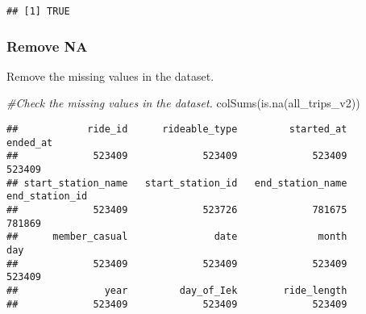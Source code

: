 \documentclass[
]{article}
\newenvironment{Shaded}{\begin{snugshade}}{\end{snugshade}}
\newcommand{\CommentTok}[1]{\textcolor[rgb]{0.56,0.35,0.01}{\textit{#1}}}
\newcommand{\DecValTok}[1]{\textcolor[rgb]{0.00,0.00,0.81}{#1}}
\newcommand{\FunctionTok}[1]{\textcolor[rgb]{0.00,0.00,0.00}{#1}}
\newcommand{\NormalTok}[1]{#1}
\newcommand{\OtherTok}[1]{\textcolor[rgb]{0.56,0.35,0.01}{#1}}
\newcommand{\SpecialCharTok}[1]{\textcolor[rgb]{0.00,0.00,0.00}{#1}}
\newcommand{\StringTok}[1]{\textcolor[rgb]{0.31,0.60,0.02}{#1}}
\begin{document}
\begin{verbatim}
## [1] TRUE
\end{verbatim}

\begin{Shaded}
\end{Shaded}

\hypertarget{remove-na}{%
\subsubsection{Remove NA}\label{remove-na}}

Remove the missing values in the dataset.

\begin{Shaded}
\begin{Highlighting}[]
\CommentTok{\#Check the missing values in the dataset.}
\FunctionTok{colSums}\NormalTok{(}\FunctionTok{is.na}\NormalTok{(all\_trips\_v2))}
\end{Highlighting}
\end{Shaded}

\begin{verbatim}
##            ride_id      rideable_type         started_at           ended_at 
##             523409             523409             523409             523409 
## start_station_name   start_station_id   end_station_name     end_station_id 
##             523409             523726             781675             781869 
##      member_casual               date              month                day 
##             523409             523409             523409             523409 
##               year         day_of_Iek        ride_length 
##             523409             523409             523409
\end{verbatim}
\end{document}
